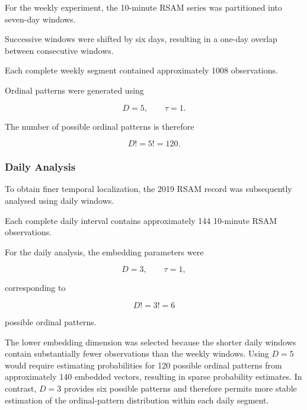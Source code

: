 \documentclass[journal]{IEEEtran}
\begin{document}
	For the weekly experiment, the 10-minute RSAM series was
	partitioned into seven-day windows.
	
	Successive windows were shifted by six days, resulting in a
	one-day overlap between consecutive windows.
	
	Each complete weekly segment contained approximately 1008
	observations.
	
	Ordinal patterns were generated using
	
	\begin{equation}
		D=5,
		\qquad
		\tau=1.
	\end{equation}
	
	The number of possible ordinal patterns is therefore
	
	\begin{equation}
		D! = 5! = 120.
	\end{equation}
	
	
	\subsubsection{Daily Analysis}
	
	To obtain finer temporal localization, the 2019 RSAM record was
	subsequently analysed using daily windows.
	
	Each complete daily interval contains approximately 144
	10-minute RSAM observations.
	
	For the daily analysis, the embedding parameters were
	
	\begin{equation}
		D=3,
		\qquad
		\tau=1,
	\end{equation}
	
	corresponding to
	
	\begin{equation}
		D! = 3! = 6
	\end{equation}
	
	possible ordinal patterns.
	
	The lower embedding dimension was selected because the shorter
	daily windows contain substantially fewer observations than the
	weekly windows. Using $D=5$ would require estimating probabilities
	for 120 possible ordinal patterns from approximately 140 embedded
	vectors, resulting in sparse probability estimates. In contrast,
	$D=3$ provides six possible patterns and therefore permits more
	stable estimation of the ordinal-pattern distribution within each
	daily segment.
	
	
\end{document}
